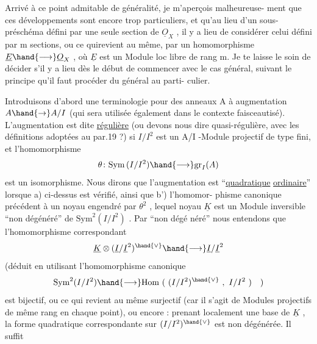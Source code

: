 \margin{\unsure{$\diagdown$}}

Arrivé à ce point admitable de généralité, je m'aperçois malheureuse-%
ment que ces développements sont encore trop particuliers, et qu'au lieu
d'un sous-préschéma défini par une seule section de $\underline{O}_X$ , il y a lieu de
considérer celui défini par m sections, ou ce qui\hand{/}revient au même, par un
homomorphisme $\underline{E} \hand{\longrightarrow} \underline{O}_X$ , où $\underline{E}$ est un Module loc libre de rang m. Je te
laisse le soin de décider s'il y a lieu dès le début de commencer avec le
cas général, suivant le principe qu'il faut procéder du général au parti-%
culier.

Introduisons d'abord une terminologie pour des anneaux A à
augmentation $A \hand{\to} A/I$ (qui sera utilisée également dans le contexte
faisceautisé). L'augmentation est dite \uline{régulière} (ou devons nous dire
quasi-régulière, avec les définitions adoptées au par.19 ?) si  $I/I^2$ est
un A/I -Module projectif de type fini, et  l'homomorphisme
\[ \theta\colon \mathrm{Sym}\,(I/I^2) \hand{\longrightarrow} \mathrm{gr}_I(A) \]
est un isomorphisme. Nous dirons que l'augmentation est  ``\uline{quadratique}
\uline{ordinaire}'' lorsque a) ci-dessus est vérifié, ainsi que b') l'homomor-%
phisme canonique précédent à un noyau engendré par $\theta^2$ , lequel noyau $\underline{K}$
est un Module inversible ``non dégénéré'' de $\mathrm{Sym}^2(I/I^2)$ . Par ``non dégé%
néré'' nous entendons que l'homomorphisme correspondant
\[ \underline{K} \otimes (\underline{I}/\underline{I}^2)^{\hand{\vee}} \hand{\longrightarrow} \underline{I}/\underline{I}^2 \]\margin{\unsure{$\prime$}}
(déduit en utilisant l'homomorphisme canonique
\[ \mathrm{Sym}^2(I/I^2) \hand{\longrightarrow} \mathrm{Hom}\ (\ (I/I^2)^{\hand{\vee}}\ ,\ I/I^2\ )\quad ) \]
est bijectif, ou ce qui revient au même surjectif (car il s'agit de
Modules projectifs  de même rang en chaque point), ou encore : prenant
localement une base \inserted{$\phi$} de $\underline{K}$ ,  la forme
quadratique correspondante sur $(I/I^2)^{\hand{\vee}}$ est non dégénérée. Il suffit

